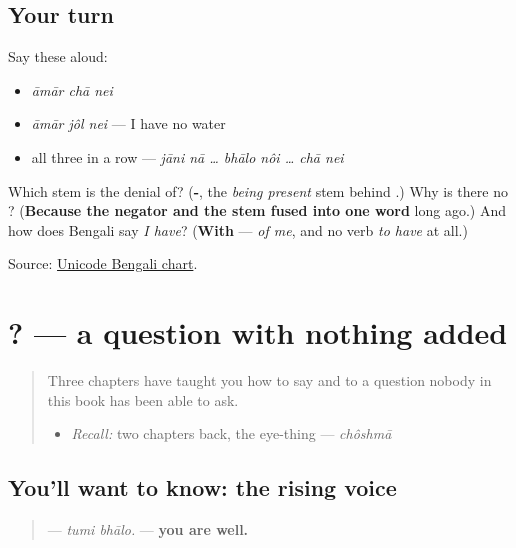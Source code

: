 \subsection*{Your turn}
Say these aloud:

\begin{itemize}
\raggedright
  \item \emph{āmār chā nei}
  \item \emph{āmār jôl nei} — I have no water
  \item all three in a row — \emph{jāni nā … bhālo nôi … chā nei}
\end{itemize}

\begin{tcolorbox}[breakable,colback=teal!4,colframe=teal!35!black,title={Before you move on}]
Which stem is \textbf{} the denial of? (\textbf{-}, the \emph{being present} stem behind \textbf{}.) Why is there no \textbf{ }? (\textbf{Because the negator and the stem fused into one word} long ago.) And how does Bengali say \emph{I have}? (\textbf{With } — \emph{of me}, and no verb \emph{to have} at all.)

Source: \href{https://www.unicode.org/charts/PDF/U0980.pdf}{Unicode Bengali chart}.
\end{tcolorbox}
\section[\texorpdfstring{\bn{তুমি} \bn{ভালো}? (tumi bhālo?)}{তুমি ভালো? (tumi bhālo?)}]{ ? — a question with nothing added}

\label{lesson:BN-C16-polar}



\begin{quote}
Three chapters have taught you how to say \textbf{} and \textbf{} to a question nobody in this book has been able to ask.

\begin{itemize}
\raggedright
  \item \emph{Recall:} two chapters back, the eye-thing — \emph{chôshmā}
\end{itemize}
\end{quote}

\subsection*{You'll want to know: the rising voice}
\begin{quote}
\textbf{ } — \emph{tumi bhālo.} — \textbf{you are well.}
\end{quote}

